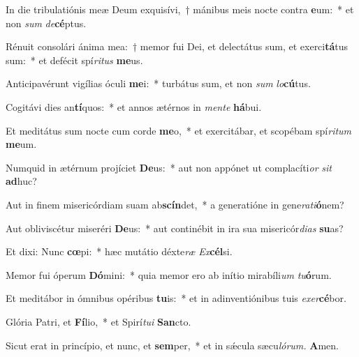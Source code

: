 \item In die tribulatiónis meæ Deum exquisívi,~† mánibus meis nocte contra \textbf{e}um:~* et non \textit{sum} \textit{de}\textbf{cé}ptus.
\item Rénuit consolári ánima mea:~† memor fui Dei, et delectátus sum, et exerci\textbf{tá}tus sum:~* et defécit spí\hspace{0.03em}\textit{ritus} \textbf{me}us.
\item Anticipavérunt vigílias óculi \textbf{me}i:~* turbátus sum, et non \textit{sum} \textit{lo}\textbf{cú}tus.
\item Cogitávi dies an\textbf{tí}quos:~* et annos ætérnos in \textit{mente} \textbf{há}bui.
\item Et meditátus sum nocte cum corde \textbf{me}o,~* et exercitábar, et scopébam spí\textit{ritum} \textbf{me}um.
\item Numquid in ætérnum projíciet \textbf{De}us:~* aut non appónet ut complacíti\hspace{0.03em}\textit{or} \textit{sit} \textbf{ad}huc?
\item Aut in finem misericórdiam suam ab\textbf{scín}det,~* a generatióne in gene\textit{rati}\textbf{ó}nem?
\item Aut obliviscétur miseréri \textbf{De}us:~* aut continébit in ira sua misericór\textit{dias} \textbf{su}as?
\item Et dixi: Nunc \textbf{cœ}pi:~* hæc mutátio déxte\textit{ræ} \textit{Ex}\textbf{cél}si.
\item Memor fui óperum \textbf{Dó}mini:~* quia memor ero ab inítio mirabíli\hspace{0.03em}\textit{um} \textit{tu}\textbf{ó}rum.
\item Et meditábor in ómnibus opéribus \textbf{tu}is:~* et in adinventiónibus tuis \textit{exer}\textbf{cé}bor.
\item Glória Patri, et \textbf{Fí}lio,~* et Spirí\hspace{0.03em}\textit{tui} \textbf{San}cto.
\item Sicut erat in princípio, et nunc, et \textbf{sem}per,~* et in sǽcula sæcu\hspace{0.03em}\textit{lórum.} \textbf{A}men.
